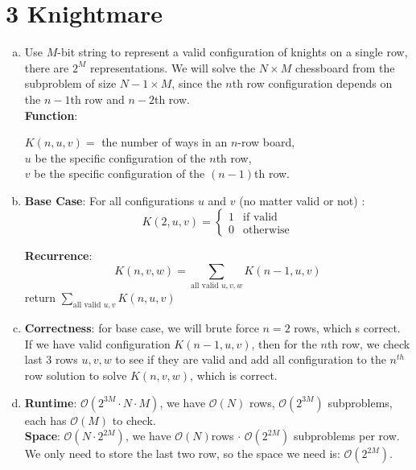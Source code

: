 \documentclass[11pt]{article}
\def\co{\textbf{Correctness}: }
\def\rt{\textbf{Runtime}: }
\def\ft{\textbf{Function}: }
\def\bc{\textbf{Base Case}: }
\def\sp{\textbf{Space}: }
\def\rc{\textbf{Recurrence}: }
\newenvironment{qparts}{\begin{enumerate}[(a)]}{\end{enumerate}}
\begin{document}
	\section*{3 Knightmare} 
	\begin{qparts}
		\item Use $M$-bit string to represent a valid configuration of knights on a single row, there are $2^M$ representations. We will solve the $N\times M$ chessboard from the subproblem of size $N-1\times M$, since the $n$th row configuration depends on the $n-1$th row and $n-2$th row. \\
		\ft 
		\begin{center}
			$K(n, u, v) = $ the number of ways in an $n$-row board, \\
			$u$ be the specific configuration of the $n$th row, \\
			$v$ be the specific configuration of the $(n-1)$th row.
		\end{center} 
		
		\item \bc For all configurations $u$ and $v$ (no matter valid or not) :
		$$K(2, u, v) = \begin{cases}
			1 & \text{if valid}\\
			0 & \text{otherwise}
		\end{cases}$$
		
		\rc \\
		$$K(n, v, w) = \sum_{\text{all valid } u, v, w}K(n-1, u, v)$$
		return $\sum_{\text{all valid } u, v}K(n, u, v)$	
		
		\item \co for base case, we will brute force $n = 2$ rows, which s correct. If we have valid configuration $K(n-1, u, v)$, then for the $n$th row, we check last $3$ rows $u, v, w$ to see if they are valid and add all configuration to the $n^{th}$ row solution to solve $K(n, v, w)$, which is correct.
		
		\item \rt $\mathcal{O}(2^{3M}\cdot N\cdot M)$, we have $\mathcal{O}(N)$ rows, $\mathcal{O}(2^{3M})$ subproblems, each has $\mathcal{O}(M)$ to check.\\
		\sp $\mathcal{O}(N\cdot 2^{2M})$, we have $\mathcal{O}(N)$rows $\cdot$ $\mathcal{O}(2^{2M})$ subproblems per row.\\
		We only need to store the last two row, so the space we need is: $\mathcal{O}(2^{2M})$.
	\end{qparts}
	
\end{document}
